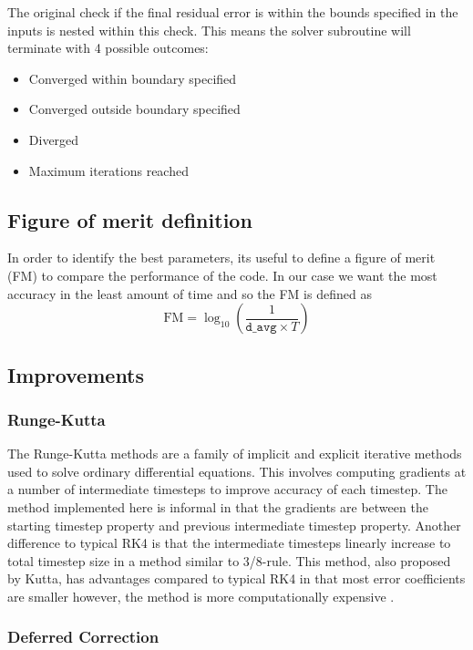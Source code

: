 \documentclass{article}
\begin{document}
The original check if the final residual error is within the bounds specified in the inputs is nested within this check.
This means the solver subroutine will terminate with 4 possible outcomes:
\begin{itemize}
    \item Converged within boundary specified
    \item Converged outside boundary specified
    \item Diverged
    \item Maximum iterations reached
\end{itemize}

\subsection{Figure of merit definition}
In order to identify the best parameters, its useful to define a figure of merit (FM) to compare the performance of the code.
In our case we want the most accuracy in the least amount of time and so the FM is defined as
\begin{equation}
    \text{FM} = \log_{10} \left( \frac{1}{\texttt{d\_avg} \times T} \right) \label{eq:FM}
\end{equation}

\subsection{Improvements}
\subsubsection{Runge-Kutta}

The Runge-Kutta methods are a family of implicit and explicit iterative methods used to solve ordinary differential equations.
This involves computing gradients at a number of intermediate timesteps to improve accuracy of each timestep.
The method implemented here is informal in that the gradients are between the starting timestep property and previous intermediate timestep property.
Another difference to typical RK4 is that the intermediate timesteps linearly increase to total timestep size in a method similar to 3/8-rule.
This method, also proposed by Kutta, has advantages compared to typical RK4 in that most error coefficients are smaller however, the method is more computationally expensive \cite{solve_ODE_nonstiff}.


\subsubsection{Deferred Correction}
\end{document}
